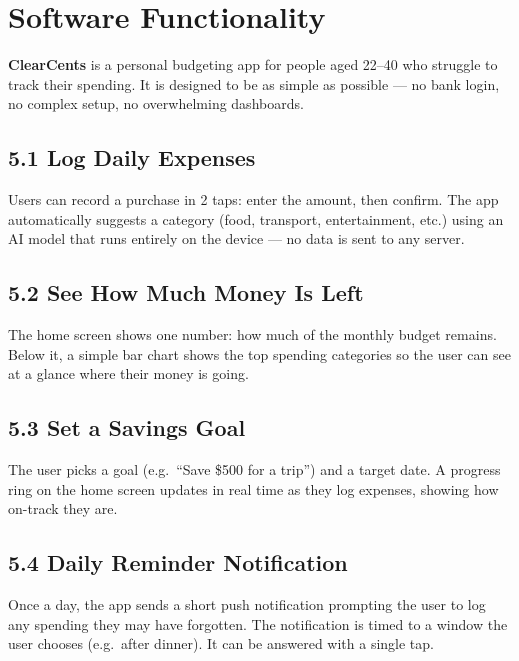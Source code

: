 \documentclass[11pt,a4paper]{article}
\begin{document}
\newpage

\section{Software Functionality}

\textbf{ClearCents} is a personal budgeting app for people aged 22--40 who struggle to
track their spending. It is designed to be as simple as possible --- no bank login, no
complex setup, no overwhelming dashboards.

\subsection{5.1 Log Daily Expenses}

Users can record a purchase in 2 taps: enter the amount, then confirm. The app
automatically suggests a category (food, transport, entertainment, etc.) using an
AI model that runs entirely on the device --- no data is sent to any server.

\subsection{5.2 See How Much Money Is Left}

The home screen shows one number: how much of the monthly budget remains. Below it,
a simple bar chart shows the top spending categories so the user can see at a glance
where their money is going.

\subsection{5.3 Set a Savings Goal}

The user picks a goal (e.g.\ ``Save \$500 for a trip'') and a target date. A progress
ring on the home screen updates in real time as they log expenses, showing how on-track
they are.

\subsection{5.4 Daily Reminder Notification}

Once a day, the app sends a short push notification prompting the user to log any
spending they may have forgotten. The notification is timed to a window the user
chooses (e.g.\ after dinner). It can be answered with a single tap.
\end{document}
